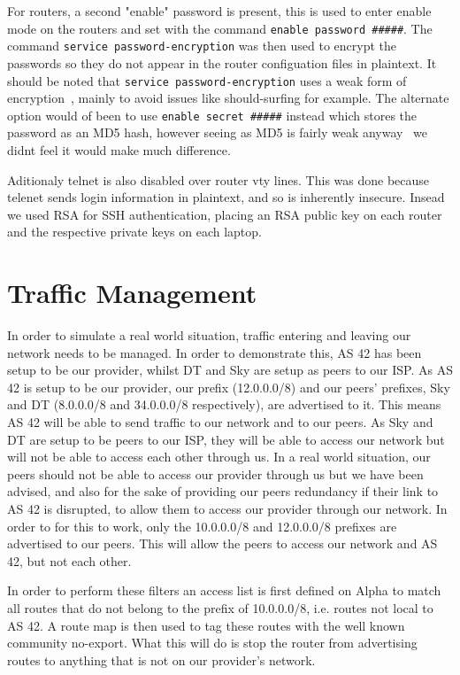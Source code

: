 For routers, a second "enable" password is present, this is used to enter
enable mode on the routers and set with the command \texttt{enable password
\#\#\#\#\#}. The command \texttt{service password-encryption} was then used to
encrypt the passwords so they do not appear in the router configuation files in
plaintext. It should be noted that \texttt{service password-encryption} uses a
weak form of encryption~\cite{ciscocracker}, mainly to avoid issues like
should-surfing for example. The alternate option would of been to use
\texttt{enable secret \#\#\#\#\#} instead which stores the password as an MD5
hash, however seeing as MD5 is fairly weak anyway~\cite{md5} we didnt feel it
would make much difference.

Aditionaly telnet is also disabled over router vty lines. This was done because
telenet sends login information in plaintext, and so is inherently insecure.
Insead we used RSA for SSH authentication, placing an RSA public key on each
router and the respective private keys on each laptop.


\section{Traffic Management} In order to simulate a real world situation,
traffic entering and leaving our network needs to be managed. In order to
demonstrate this, AS 42 has been setup to be our provider, whilst DT and Sky are
setup as peers to our ISP. As AS 42 is setup to be our provider, our prefix
(12.0.0.0/8) and our peers' prefixes, Sky and DT (8.0.0.0/8 and 34.0.0.0/8
respectively), are advertised to it. This means AS 42 will be able to send
traffic to our network and to our peers. As Sky and DT are setup to be peers to
our ISP, they will be able to access our network but will not be able to access
each other through us. In a real world situation, our peers should not be able
to access our provider through us but we have been advised, and also for the
sake of providing our peers redundancy if their link to AS 42 is disrupted, to
allow them to access our provider through our network. In order to for this to
work, only the 10.0.0.0/8 and 12.0.0.0/8 prefixes are advertised to our peers.
This will allow the peers to access our network and AS 42, but not each other.

In order to perform these filters an access list is first defined on Alpha to
match all routes that do not belong to the prefix of 10.0.0.0/8, i.e. routes
not local to AS 42. A route map is then used to tag these routes with the well
known community no-export. What this will do is stop the router from advertising
routes to anything that is not on our provider's network.

